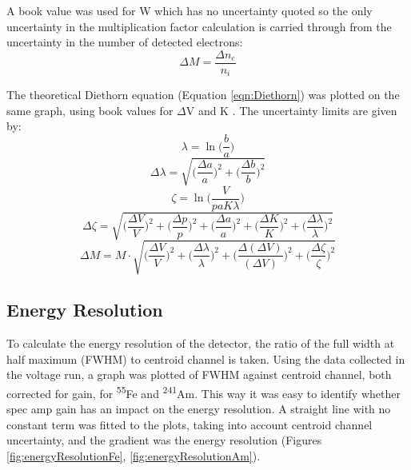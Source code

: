 A book value was used for W \cite{Wolff_W_dV_K} which has no uncertainty quoted so the only uncertainty in the multiplication factor calculation is carried through from the uncertainty in the number of detected electrons:
\begin{equation}
    \Delta M = \frac{\Delta n_{e}}{n_{i}}
\end{equation}

The theoretical Diethorn equation (Equation \ref{eqn:Diethorn}) was plotted on the same graph, using book values for $\Delta$V and K \cite{Wolff_W_dV_K}. The uncertainty limits are given by:
\begin{equation}
    \lambda = \ln{\bigg( \frac{b}{a} \bigg)}
\end{equation}
\begin{equation}
    \Delta \lambda = \sqrt{\bigg(\frac{\Delta a}{a}\bigg)^{2} + \bigg(\frac{\Delta b}{b}\bigg)^{2}}
\end{equation}
\begin{equation}
    \zeta = \ln{\bigg(\frac{V}{paK\lambda}\bigg)}
\end{equation}
\begin{equation}
    \Delta \zeta = \sqrt{\bigg(\frac{\Delta V}{V}\bigg)^{2} + \bigg(\frac{\Delta p}{p}\bigg)^{2} + \bigg(\frac{\Delta a}{a}\bigg)^{2} + \bigg(\frac{\Delta K}{K}\bigg)^{2} + \bigg(\frac{\Delta \lambda}{\lambda}\bigg)^{2}}
\end{equation}
\begin{equation}
    \Delta M = M \cdot \sqrt{\bigg(\frac{\Delta V}{V}\bigg)^{2} + \bigg(\frac{\Delta \lambda}{\lambda}\bigg)^{2} + \bigg(\frac{\Delta (\Delta V)}{(\Delta V)}\bigg)^{2} + \bigg(\frac{\Delta \zeta}{\zeta}\bigg)^{2}}
\end{equation}

\subsection{Energy Resolution}

To calculate the energy resolution of the detector, the ratio of the full width at half maximum (FWHM) to centroid channel is taken. Using the data collected in the voltage run, a graph was plotted of FWHM against centroid channel, both corrected for gain, for \textsuperscript{55}Fe and \textsuperscript{241}Am. This way it was easy to identify whether spec amp gain has an impact on the energy resolution. A straight line with no constant term was fitted to the plots, taking into account centroid channel uncertainty, and the gradient was the energy resolution (Figures \ref{fig:energyResolutionFe}, \ref{fig:energyResolutionAm}).

